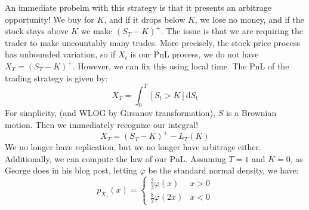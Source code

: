 \documentclass{amsart}
\theoremstyle{definition}
\begin{document}
An immediate probelm with this strategy is that it presents an arbitrage opportunity! 
We buy for $K$, and if it drops below $K$, we lose no money, and if the stock stays above $K$ we make $(S_T - K)^+$. 
The issue is that we are requiring the trader to make uncountably many trades. 
More precisely, the stock price process has unbounded variation, so if $X_t$ is our PnL process, we do not have
$
X_T = (S_T - K)^+
$.
However, we can fix this using local time. The PnL of the trading strategy is given by:
\[
X_T = \int_0^T [S_t > K] \mathrm{d} S_t
\]
For simplicity, (and WLOG by Girsanov transformation), $S$ is a Brownian motion. Then we immediately recognize our integral!
\[
X_T = (S_T - K)^+ - L_T(K)
\]
We no longer have replication, but we no longer have arbitrage either. Additionally, we can compute the law of our PnL.
Assuming $T = 1$ and $K = 0$, as George does in his blog post, letting $\varphi$ be the standard normal density, we have:
\[
p_{X_1}(x) =
\begin{cases}
  \frac{2}{3} \varphi(x) & x > 0\\
  \frac{8}{3} \varphi(2x) & x < 0
\end{cases}
\]
\end{document}
